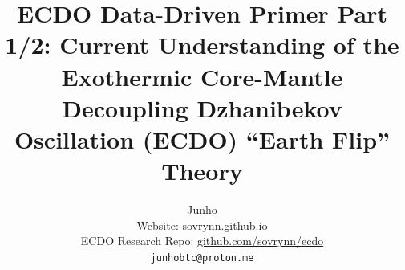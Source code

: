 \documentclass[10pt,twocolumn,letterpaper]{article}
\begin{document}
\title{ECDO Data-Driven Primer Part 1/2: Current Understanding of the Exothermic Core-Mantle Decoupling Dzhanibekov Oscillation (ECDO) “Earth Flip” Theory}

\author{Junho\\
Website: \href{https://sovrynn.github.io}{sovrynn.github.io}\\
ECDO Research Repo: \href{https://github.com/sovrynn/ecdo}{github.com/sovrynn/ecdo}\\
{\tt\small junhobtc@proton.me}
}

\maketitle
\end{document}
